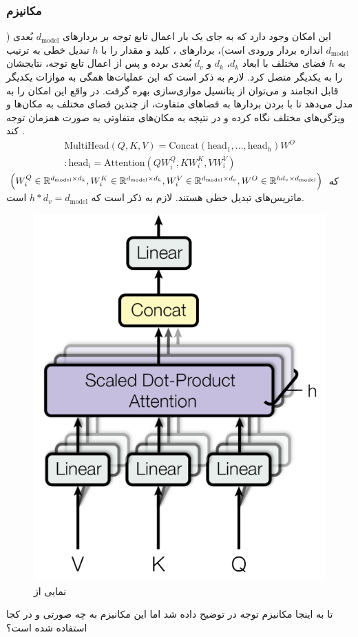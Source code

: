 \subsubsection{مکانیزم \multiheadattention{}}
این امکان وجود دارد که به جای یک بار اعمال تابع توجه بر بردارهای $d_\text{model}$ بُعدی ($d_\text{model}$ اندازه بردار ورودی است)، بردارهای \query{}، کلید و مقدار را با $h$ تبدیل خطی به ترتیب به $h$ فضای مختلف با ابعاد $d_k$، $d_k$ و $d_v$ بُعدی برده و پس از اعمال تابع توجه، نتایجشان را به یکدیگر متصل کرد. لازم به ذکر است که این عملیات‌ها همگی به موازات یکدیگر  قابل انجامند و می‌توان از پتانسیل موازی‌سازی \gpu{} بهره گرفت. در واقع \multiheadattention{} این امکان را به مدل می‌دهد تا با بردن بردارها به فضاهای متفاوت، از چندین فضای مختلف به مکان‌ها و ویژگی‌های مختلف نگاه کرده و در نتیجه به مکان‌های متفاوتی به صورت همزمان توجه کند \cite{transformer}.
\begin{gather}
	\text{MultiHead}(Q, K, V) = \text{Concat}(\text{head}_1, ..., \text{head}_h)W^O \nonumber
	\\
	: \text{head}_i = \text{Attention}(QW_i^Q, KW_i^K, VW_i^V)
\end{gather}
که
$\Big(
	W_i^Q \in {\mathbb{R}}^{d_\text{model} \times d_k},
	W_i^K \in {\mathbb{R}}^{d_\text{model} \times d_k},
	W_i^V \in {\mathbb{R}}^{d_\text{model} \times d_v},
	W^O \in {\mathbb{R}}^{hd_v \times d_\text{model}}\Big)$
ماتریس‌های تبدیل خطی هستند. لازم به ذکر است که $h * d_v = d_\text{model}$ است.
\begin{figure}[H]
	\centering
	\includegraphics[width=.4
		\textwidth]{images/attention2.png}
	\caption{نمایی از \multiheadattention{}}
\end{figure}
تا به اینجا مکانیزم توجه در \transformer{} توضیح داده شد اما این مکانیزم به چه صورتی و در کجا استفاده شده است؟
